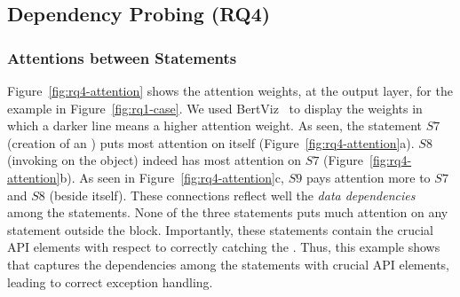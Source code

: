 \subsection{Dependency Probing (RQ4)}
\label{sec:rq4}


\subsubsection{Attentions between Statements}
Figure~\ref{fig:rq4-attention} shows the attention weights, at the
output layer, for the example in Figure~\ref{fig:rq1-case}. We used
BertViz~\cite{bertviz} to display the weights in which a darker line
means a higher attention weight. As seen, the statement $S7$ (creation
of an ) puts most attention on itself
(Figure~\ref{fig:rq4-attention}a). $S8$ (invoking 
on the  object) indeed has most attention on $S7$
(Figure~\ref{fig:rq4-attention}b). As seen in
Figure~\ref{fig:rq4-attention}c, $S9$ pays attention more to $S7$ and $S8$
(beside itself). These connections reflect well the {\em data dependencies}
among the statements. None of the three statements puts much attention
on any statement outside the  block. Importantly, these
statements contain the crucial API elements with respect to correctly catching
the . Thus, this example shows that {\tool} captures
the dependencies among the statements with crucial API elements, leading to
correct exception handling.


